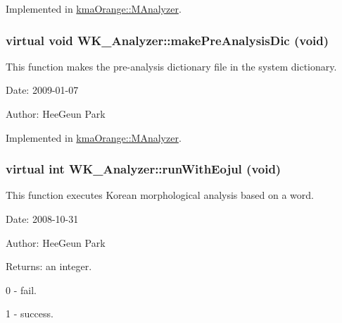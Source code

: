 Implemented in \hyperlink{classkmaOrange_1_1MAnalyzer_e7716138f50d32a2b5b77d7fe3de9810}{kmaOrange::MAnalyzer}.\hypertarget{classWK__Analyzer_da45001afbdf5c6edd922d80abfd22e7}{
\subsubsection[{makePreAnalysisDic}]{\setlength{\rightskip}{0pt plus 5cm}virtual void WK\_\-Analyzer::makePreAnalysisDic (void)}}
\label{classWK__Analyzer_da45001afbdf5c6edd922d80abfd22e7}


This function makes the pre-analysis dictionary file in the system dictionary. 

\begin{Desc}
\item[Date:]2009-01-07 \end{Desc}
\begin{Desc}
\item[Author:]HeeGeun Park \end{Desc}


Implemented in \hyperlink{classkmaOrange_1_1MAnalyzer_af19bcf0278806c078ad0497cff9ba41}{kmaOrange::MAnalyzer}.\hypertarget{classWK__Analyzer_98f004c5f30d8fbe68a477c12666c4a6}{
\subsubsection[{runWithEojul}]{\setlength{\rightskip}{0pt plus 5cm}virtual int WK\_\-Analyzer::runWithEojul (void)}}
\label{classWK__Analyzer_98f004c5f30d8fbe68a477c12666c4a6}


This function executes Korean morphological analysis based on a word. 

\begin{Desc}
\item[Date:]2008-10-31 \end{Desc}
\begin{Desc}
\item[Author:]HeeGeun Park \end{Desc}
\begin{Desc}
\item[Returns:]an integer.\par
 0 - fail.\par
 1 - success. \end{Desc}


